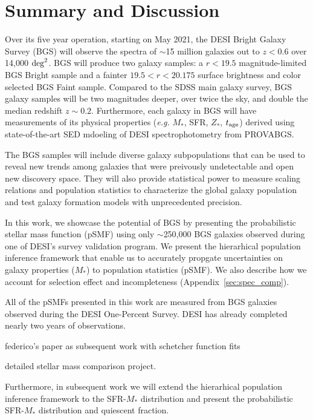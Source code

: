 \section{Summary and Discussion} \label{sec:summary}
Over its five year operation, starting on May 2021, the DESI Bright Galaxy
Survey (BGS) will observe the spectra of $\sim$15 million galaxies out to 
$z < 0.6$ over 14,000 ${\rm deg}^2$.  
BGS will produce two galaxy samples: a $r < 19.5$ magnitude-limited BGS Bright
sample and a fainter $19.5 < r < 20.175$ surface brightness and color selected
BGS Faint sample. 
Compared to the SDSS main galaxy survey, BGS galaxy samples will be two
magnitudes deeper, over twice the sky, and double the median redshift
$z\sim0.2$. 
Furthermore, each galaxy in BGS will have measurements of its physical
properties (\emph{e.g.} $M_*$, SFR, $Z_*$, $t_{\rm age}$) derived using
state-of-the-art SED mdoeling of DESI spectrophotometry from PROVABGS. 

The BGS samples will include diverse galaxy subpopulations that can be used to
reveal new trends among galaxies that were preivously undetectable and open
new discovery space. 
They will also provide statistical power to measure scaling relations and
population statistics to characterize the global galaxy population and test
galaxy formation models with unprecedented precision.

In this work, we showcase the potential of BGS by presenting the probabilistic
stellar mass function (pSMF) using only $\sim$250,000 BGS galaxies observed
during one of DESI's survey validation program.
We present the hierarhical population inference framework that enable us to
accurately propgate uncertainties on galaxy properties ($M_*$) to population
statistics (pSMF). 
We also describe how we account for selection effect and incompleteness
(Appendix~\ref{sec:spec_comp}).  


All of the pSMFs presented in this work are measured from BGS galaxies observed during the DESI One-Percent Survey. 
DESI has already completed nearly two years of observations.


federico's paper as subsequent work with schetcher function fits

detailed stellar mass comparison project. 

Furthermore, in subsequent work we will extend the hierarhical population
inference framework to the SFR-$M_*$ distribution and present the
probabilistic SFR-$M_*$ distribution and quiescent fraction. 

